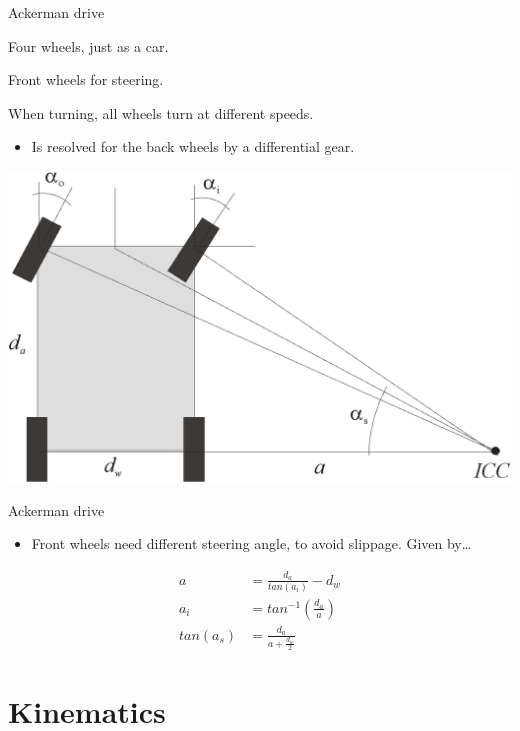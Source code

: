 \documentclass[compress]{beamer}
\begin{document}
\begin{frame}{Ackerman drive}

Four wheels, just as a car.

Front wheels for steering.

When turning, all wheels turn at different speeds.

\begin{itemize}
    \item Is resolved for the back wheels by a differential gear.
\end{itemize}

    \begin{center}
        \includegraphics[width=0.8\linewidth]{ackerman_drive}
    \end{center}
\end{frame}

\begin{frame}{Ackerman drive}

\begin{itemize}
    \item Front wheels need different steering angle, to avoid slippage. Given
  by\ldots{}
\end{itemize}

    \begin{align*}
        a &= \frac{d_a}{tan(a_i)} - d_w \\
        a_i &= tan^{-1}(\frac{d_a}{a}) \\
        tan(a_s) &= \frac{d_a}{a + \frac{d_w}{2}}
    \end{align*}
\end{frame}

\section{Kinematics}
\end{document}

